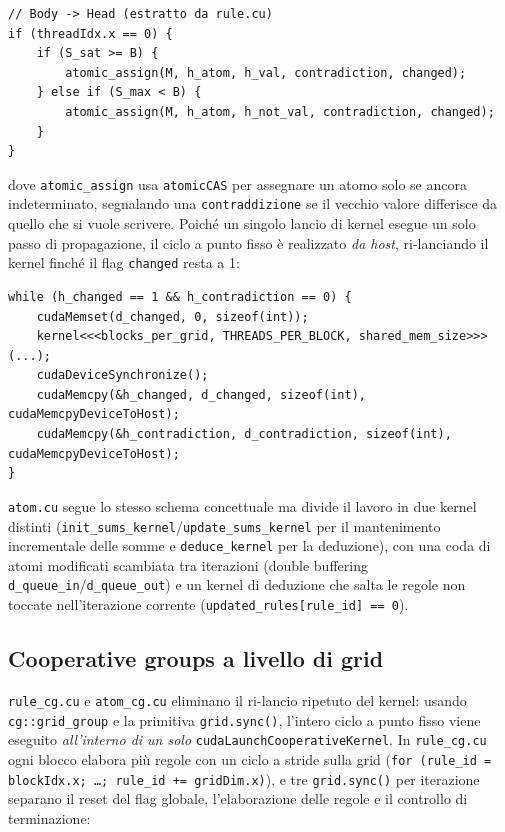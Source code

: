 \documentclass[11pt,a4paper]{article}
\begin{document}
\begin{lstlisting}
// Body -> Head (estratto da rule.cu)
if (threadIdx.x == 0) {
    if (S_sat >= B) {
        atomic_assign(M, h_atom, h_val, contradiction, changed);
    } else if (S_max < B) {
        atomic_assign(M, h_atom, h_not_val, contradiction, changed);
    }
}
\end{lstlisting}

dove \texttt{atomic\_assign} usa \texttt{atomicCAS} per assegnare un atomo solo se ancora
indeterminato, segnalando una \texttt{contraddizione} se il vecchio valore differisce da quello che
si vuole scrivere. Poiché un singolo lancio di kernel esegue un solo passo di propagazione, il ciclo
a punto fisso è realizzato \emph{da host}, ri-lanciando il kernel finché il flag
\texttt{changed} resta a 1:

\begin{lstlisting}
while (h_changed == 1 && h_contradiction == 0) {
    cudaMemset(d_changed, 0, sizeof(int));
    kernel<<<blocks_per_grid, THREADS_PER_BLOCK, shared_mem_size>>>(...);
    cudaDeviceSynchronize();
    cudaMemcpy(&h_changed, d_changed, sizeof(int), cudaMemcpyDeviceToHost);
    cudaMemcpy(&h_contradiction, d_contradiction, sizeof(int), cudaMemcpyDeviceToHost);
}
\end{lstlisting}

\texttt{atom.cu} segue lo stesso schema concettuale ma divide il lavoro in due kernel distinti
(\texttt{init\_sums\_kernel}/\texttt{update\_sums\_kernel} per il mantenimento incrementale delle
somme e \texttt{deduce\_kernel} per la deduzione), con una coda di atomi modificati scambiata tra
iterazioni (double buffering \texttt{d\_queue\_in}/\texttt{d\_queue\_out}) e un kernel di deduzione
che salta le regole non toccate nell'iterazione corrente (\texttt{updated\_rules[rule\_id] == 0}).

\subsection{Cooperative groups a livello di grid}

\texttt{rule\_cg.cu} e \texttt{atom\_cg.cu} eliminano il ri-lancio ripetuto del kernel: usando
\texttt{cg::grid\_group} e la primitiva \texttt{grid.sync()}, l'intero ciclo a punto fisso viene
eseguito \emph{all'interno di un solo} \texttt{cudaLaunchCooperativeKernel}. In \texttt{rule\_cg.cu}
ogni blocco elabora più regole con un ciclo a stride sulla grid
(\texttt{for (rule\_id = blockIdx.x; \dots; rule\_id += gridDim.x)}), e tre \texttt{grid.sync()}
per iterazione separano il reset del flag globale, l'elaborazione delle regole e il controllo di
terminazione:
\end{document}
